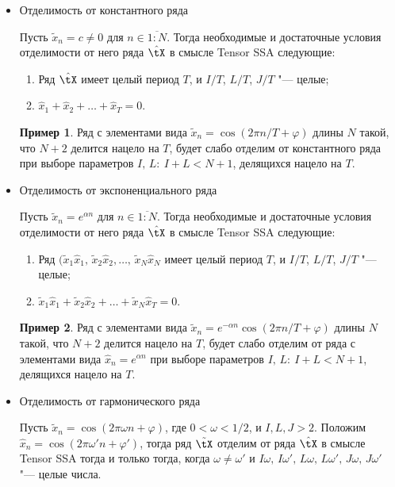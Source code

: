 \documentclass[specialist,
    substylefile = spbu_report.rtx,
    subf,href,colorlinks=true, 12pt]{disser}
\theoremstyle{plain}
\theoremstyle{definition}
\newtheorem{example}{Пример}[section]
\theoremstyle{remark}
\begin{document}
    \begin{itemize}
        \item Отделимость от константного ряда

        Пусть $\tilde{x}_n=c\ne 0$ для $n\in\overline{1:N}$.
        Тогда необходимые и достаточные условия отделимости от него ряда $\hat{\tX}$ в смысле Tensor SSA следующие:
        \begin{enumerate}
            \item Ряд $\hat{\tX}$ имеет целый период $T$, и $I/T$, $L/T$, $J/T$ "--- целые;
            \item $\hat{x}_{1}+\hat{x}_2+\ldots+\hat{x}_T=0$.
        \end{enumerate}
        \begin{example}
            Ряд с элементами вида $\tilde{x}_n=\cos(2\pi n / T + \varphi)$ длины $N$ такой, что $N+2$ делится нацело на
            $T$, будет слабо отделим от константного ряда при выборе параметров $I,\, L:\: I+L< N+1$, делящихся нацело на $T$.
        \end{example}
        \item Отделимость от экспоненциального ряда

        Пусть $\tilde{x}_n=e^{\alpha n}$ для $n\in\overline{1:N}$.
        Тогда необходимые и достаточные условия отделимости от него ряда $\hat{\tX}$ в смысле Tensor SSA следующие:
        \begin{enumerate}
            \item Ряд $(\tilde{x}_{1}\hat{x}_{1},\, \tilde{x}_{2}\hat{x}_{2},\ldots,\, \tilde{x}_{N}\hat{x}_{N}$
            имеет целый период $T$, и $I/T$, $L/T$, $J/T$ "--- целые;
            \item $\tilde{x}_{1}\hat{x}_{1}+\tilde{x}_{2}\hat{x}_2+\ldots+\tilde{x}_{N}\hat{x}_T=0$.
        \end{enumerate}
        \begin{example}
            Ряд с элементами вида $\tilde{x}_n=e^{-\alpha n}\cos(2\pi n / T + \varphi)$ длины $N$ такой, что $N+2$ делится нацело на
            $T$, будет слабо отделим от ряда с элементами вида $\hat{x}_n=e^{\alpha n}$ при выборе параметров $I,\, L:\: I+L< N+1$, делящихся нацело на $T$.
        \end{example}
        \item Отделимость от гармонического ряда

        Пусть $\tilde{x}_n=\cos(2\pi \omega n + \varphi)$, где $0 < \omega < 1/2$, и $I, L, J > 2$.
        Положим $\hat{x}_n=\cos(2\pi \omega' n + \varphi')$,
        тогда ряд $\tilde{\tX}$ отделим от ряда $\hat{\tX}$ в смысле Tensor SSA тогда и только тогда, когда $\omega\ne\omega'$
        и $I\omega,\, I\omega',\, L\omega,\, L\omega',\, J\omega,\, J\omega'$ "--- целые числа.
    \end{itemize}
\end{document}

